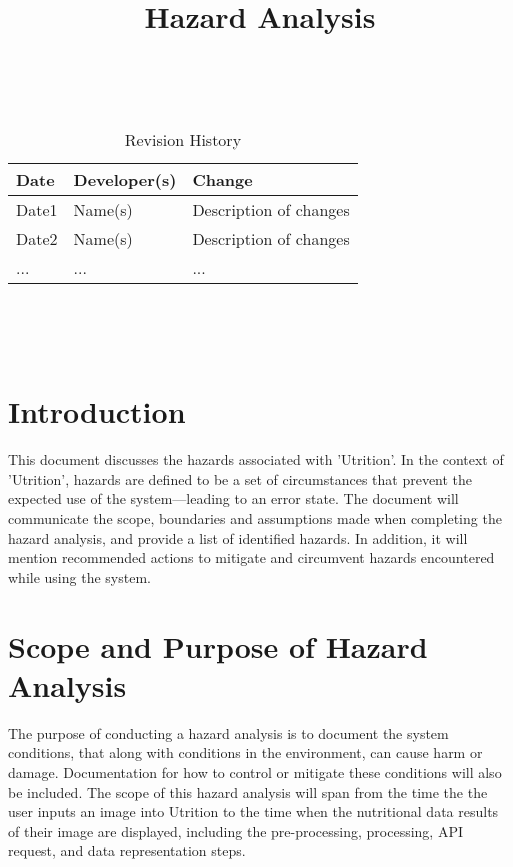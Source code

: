 \documentclass{article}
\title{Hazard Analysis\\\progname}
\author{\authname}
\date{}
\begin{document}
\maketitle
\thispagestyle{empty}

~\newpage


\begin{table}[hp]
	\caption{Revision History} \label{TblRevisionHistory}
	\begin{tabularx}{\textwidth}{llX}
		\toprule
		\textbf{Date} & \textbf{Developer(s)} & \textbf{Change}\\
		\midrule
		Date1 & Name(s) & Description of changes\\
		Date2 & Name(s) & Description of changes\\
		... & ... & ...\\
		\bottomrule
	\end{tabularx}
\end{table}

~\newpage

\tableofcontents

~\newpage



\section{Introduction}

This document discusses the hazards associated with 'Utrition'. In the context 
of 'Utrition', hazards are defined to be a set of circumstances that prevent 
the expected use of the system---leading to an error state. The document will 
communicate the scope, boundaries and assumptions made when completing the 
hazard analysis, and provide a list of identified hazards. In addition, it will 
mention recommended actions to mitigate and circumvent hazards encountered 
while using the system.

\section{Scope and Purpose of Hazard Analysis}
The purpose of conducting a hazard analysis is to document the system conditions, that along with conditions in the environment, can cause harm or damage. Documentation for how to control or mitigate these conditions will also be included. The scope of this hazard analysis will span from the time the the user inputs an image into Utrition to the time when the nutritional data results of their image are displayed, including the pre-processing, processing, API request, and data representation steps.
\end{document}
